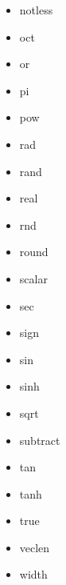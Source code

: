 \begin{multicols}{4}
{\begin{itemize}[leftmargin=0mm,label={}]
    \item notless
    \item oct
    \item or
    \item pi
    \item pow
    \item rad
    \item rand
    \item real
    \item rnd
    \item round
    \item scalar
    \item sec
    \item sign
    \item sin
    \item sinh
    \item sqrt
    \item subtract
    \item tan
    \item tanh
    \item true
    \item veclen
    \item width
\end{itemize}
}
\end{multicols}




\ \\
